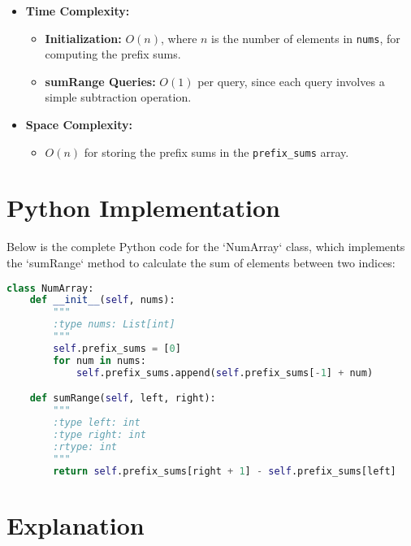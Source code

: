 \begin{itemize}
    \item \textbf{Time Complexity:} 
    \begin{itemize}
        \item \textbf{Initialization:} \( O(n) \), where \( n \) is the number of elements in \texttt{nums}, for computing the prefix sums.
        \item \textbf{sumRange Queries:} \( O(1) \) per query, since each query involves a simple subtraction operation.
    \end{itemize}
    
    \item \textbf{Space Complexity:} 
    \begin{itemize}
        \item \( O(n) \) for storing the prefix sums in the \texttt{prefix\_sums} array.
    \end{itemize}
\end{itemize}

\newpage
\section*{Python Implementation}


Below is the complete Python code for the `NumArray` class, which implements the `sumRange` method to calculate the sum of elements between two indices:

\begin{fullwidth}
\begin{lstlisting}[language=Python]
class NumArray:
    def __init__(self, nums):
        """
        :type nums: List[int]
        """
        self.prefix_sums = [0]
        for num in nums:
            self.prefix_sums.append(self.prefix_sums[-1] + num)

    def sumRange(self, left, right):
        """
        :type left: int
        :type right: int
        :rtype: int
        """
        return self.prefix_sums[right + 1] - self.prefix_sums[left]
\end{lstlisting}
\end{fullwidth}

\section*{Explanation}

